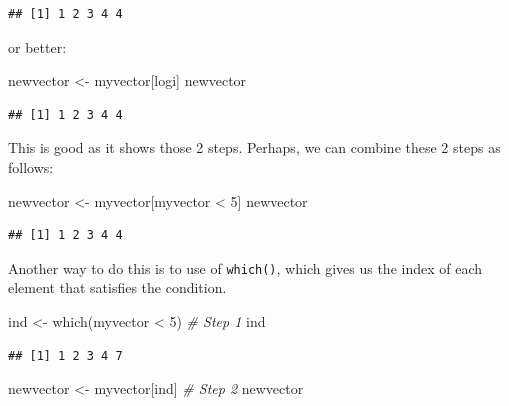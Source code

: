\documentclass[
]{book}
\newenvironment{Shaded}{\begin{snugshade}}{\end{snugshade}}
\newcommand{\CommentTok}[1]{\textcolor[rgb]{0.56,0.35,0.01}{\textit{#1}}}
\newcommand{\DecValTok}[1]{\textcolor[rgb]{0.00,0.00,0.81}{#1}}
\newcommand{\FunctionTok}[1]{\textcolor[rgb]{0.00,0.00,0.00}{#1}}
\newcommand{\NormalTok}[1]{#1}
\newcommand{\OtherTok}[1]{\textcolor[rgb]{0.56,0.35,0.01}{#1}}
\newcommand{\SpecialCharTok}[1]{\textcolor[rgb]{0.00,0.00,0.00}{#1}}
\theoremstyle{definition}
\theoremstyle{definition}
\theoremstyle{definition}
\theoremstyle{definition}
\theoremstyle{remark}
\begin{document}
\begin{verbatim}
## [1] 1 2 3 4 4
\end{verbatim}

or better:

\begin{Shaded}
\begin{Highlighting}[]
\NormalTok{newvector }\OtherTok{\textless{}{-}}\NormalTok{ myvector[logi]}
\NormalTok{newvector}
\end{Highlighting}
\end{Shaded}

\begin{verbatim}
## [1] 1 2 3 4 4
\end{verbatim}

This is good as it shows those 2 steps. Perhaps, we can combine these 2 steps as follows:

\begin{Shaded}
\begin{Highlighting}[]
\NormalTok{newvector }\OtherTok{\textless{}{-}}\NormalTok{ myvector[myvector }\SpecialCharTok{\textless{}} \DecValTok{5}\NormalTok{]}
\NormalTok{newvector}
\end{Highlighting}
\end{Shaded}

\begin{verbatim}
## [1] 1 2 3 4 4
\end{verbatim}

Another way to do this is to use of \texttt{which()}, which gives us the index of each element that satisfies the condition.

\begin{Shaded}
\begin{Highlighting}[]
\NormalTok{ind }\OtherTok{\textless{}{-}} \FunctionTok{which}\NormalTok{(myvector }\SpecialCharTok{\textless{}} \DecValTok{5}\NormalTok{)  }\CommentTok{\# Step 1}
\NormalTok{ind}
\end{Highlighting}
\end{Shaded}

\begin{verbatim}
## [1] 1 2 3 4 7
\end{verbatim}

\begin{Shaded}
\begin{Highlighting}[]
\NormalTok{newvector }\OtherTok{\textless{}{-}}\NormalTok{ myvector[ind]  }\CommentTok{\# Step 2}
\NormalTok{newvector}
\end{Highlighting}
\end{Shaded}
\end{document}
